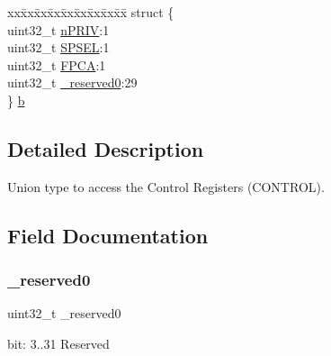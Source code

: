 \begin{DoxyCompactItemize}
\begin{tabbing}
\end{tabbing}\item 
\begin{tabbing}
xx\=xx\=xx\=xx\=xx\=xx\=xx\=xx\=xx\=\kill
struct \{\\
\>uint32\_t \mbox{\hyperlink{union_c_o_n_t_r_o_l___type_a2a6e513e8a6bf4e58db169e312172332}{nPRIV}}:1\\
\>uint32\_t \mbox{\hyperlink{union_c_o_n_t_r_o_l___type_ae185aac93686ffc78e998a9daf41415b}{SPSEL}}:1\\
\>uint32\_t \mbox{\hyperlink{union_c_o_n_t_r_o_l___type_a2518558c090f60161ba4e718a54ee468}{FPCA}}:1\\
\>uint32\_t \mbox{\hyperlink{union_c_o_n_t_r_o_l___type_ac8a6a13838a897c8d0b8bc991bbaf7c1}{\_reserved0}}:29\\
\} \mbox{\hyperlink{union_c_o_n_t_r_o_l___type_a6b6b2e7f8f9dd22517516112c8bbc729}{b}}\\

\end{tabbing}\end{DoxyCompactItemize}


\subsection{Detailed Description}
Union type to access the Control Registers (C\+O\+N\+T\+R\+OL). 

\subsection{Field Documentation}
\mbox{\label{union_c_o_n_t_r_o_l___type_ac8a6a13838a897c8d0b8bc991bbaf7c1}} 
\subsubsection{\texorpdfstring{\+\_\+reserved0}{\_reserved0}}
{\footnotesize\ttfamily uint32\+\_\+t \+\_\+reserved0}

bit\+: 3..31 Reserved \mbox{\label{union_c_o_n_t_r_o_l___type_a959a73d8faee56599b7e792a7c5a2d16}} 
